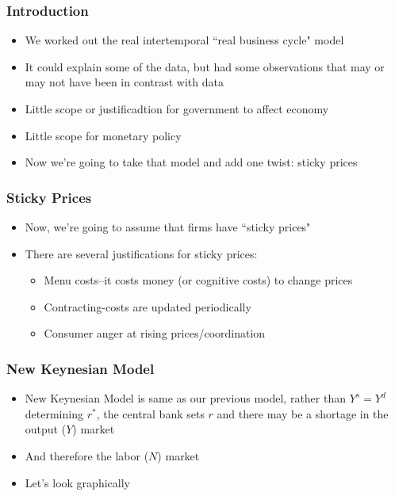 \documentclass{beamer}
\author{Trevor S. Gallen}
\date{}
\begin{document}
\renewcommand*{\inserttotalframenumber}{\pageref{lastframe}}



\begin{frame}
\titlepage
\end{frame}

\begin{frame}
\frametitle[alignment=center]{Introduction}
\begin{itemize}
\item We worked out the real intertemporal ``real business cycle" model
\bigskip
\item It could explain some of the data, but had some observations that may or may not have been in contrast with data
\bigskip
\item Little scope or justificadtion for government to affect economy
\bigskip
\item Little scope for monetary policy
\bigskip
\item Now we're going to take that model and add one twist:  sticky prices
\end{itemize}
\end{frame}

\begin{frame}
\frametitle[alignment=center]{Sticky Prices}
\begin{itemize}
\item Now, we're going to assume that firms have ``sticky prices"
\bigskip
\item There are several justifications for sticky prices:
\bigskip
\begin{itemize}
\item Menu costs--it costs money (or cognitive costs) to change prices
\bigskip
\item Contracting-costs are updated periodically
\bigskip
\item Consumer anger at rising prices/coordination
\end{itemize}
\end{itemize}
\end{frame}

\begin{frame}
\frametitle[alignment=center]{New Keynesian Model}
\begin{itemize}
\item New Keynesian Model is same as our previous model, rather than $Y^s=Y^d$ determining $r^*$, the central bank sets $r$ and there may be a shortage in the output ($Y$) market
\bigskip
\item And therefore the labor ($N$) market 
\bigskip
\item Let's look graphically
\end{itemize}
\end{frame}
\end{document}
